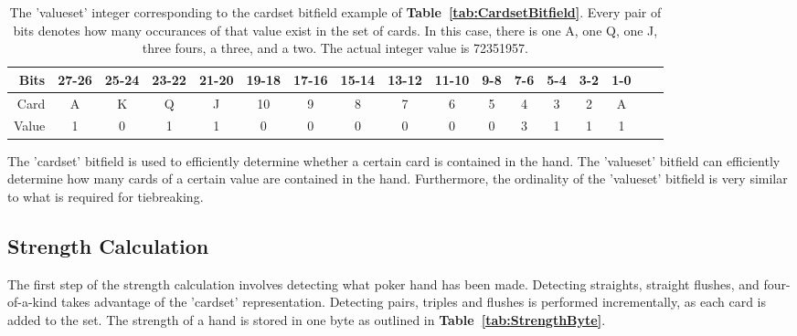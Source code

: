 \begin{table}[htb]
\captionsetup{position=top}
\caption[Valueset field]{The 'valueset' integer corresponding to the cardset bitfield example of \textbf{Table~\ref{tab:CardsetBitfield}}.
Every pair of bits denotes how many occurances of that value exist in the set of cards.
In this case, there is one A, one Q, one J, three fours, a three, and a two.
The actual integer value is 72351957.}
\begin{small}
\begin{center}
\begin{tabular}{|r|c|c|c|c|c|c|c|c|c|c|c|c|c|c|c|c|}
\hline
Bits    &  27-26 & 25-24 & 23-22 & 21-20 & 19-18 & 17-16 & 15-14 & 13-12 & 11-10 & 9-8 & 7-6 & 5-4 & 3-2 & 1-0                       \\ \hline
Card    &    A    &     K & Q     & J     & 10    &     9 &     8 & 7     &     6 &  5  &   4 &   3 & 2   & A                          \\ \hline
Value  &    1    &0      & 1     &  1    &  0    & 0     &  0    &  0    &  0    &0    &  3  & 1   & 1   & 1     \\
\hline
\end{tabular}
\label{tab:ValuesetInteger}
\end{center}
\end{small}
\end{table}

The 'cardset' bitfield is used to efficiently determine whether a certain card is contained in the hand.
The 'valueset' bitfield can efficiently determine how many cards of a certain value are contained in the hand.
Furthermore, the ordinality of the 'valueset' bitfield is very similar to what is required for tiebreaking.


\subsection{Strength Calculation}
\label{sec:StrengthCalculation}

The first step of the strength calculation involves detecting what poker hand has been made.
Detecting straights, straight flushes, and four-of-a-kind takes advantage of the 'cardset' representation.
Detecting pairs, triples and flushes is performed incrementally, as each card is added to the set.
The strength of a hand is stored in one byte as outlined in \textbf{Table~\ref{tab:StrengthByte}}.

